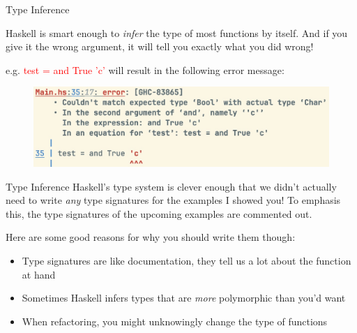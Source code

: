 \documentclass[pdf]{beamer}
\newcommand{\code}[1]{\textcolor{Red}{\textsf{#1}}}
\begin{document}
\begin{frame}[fragile]{Type Inference}
  \begin{figure}[H]
    \centering
    \hspace{0.1cm}
  \end{figure}
  Haskell is smart enough to \textit{infer} the type of most functions by itself. And if you give it the wrong argument, it will tell you exactly what you did wrong!

  e.g. \code{test = and True 'c'} will result in the following error message:
  \begin{figure}[H]
    \centering
    \includegraphics[width=\linewidth]{and-type-error}
  \end{figure}
\end{frame}

\begin{frame}{Type Inference}
  Haskell's type system is clever enough that we didn't actually need to write \emph{any} type signatures for the examples I showed you!
  To emphasis this, the type signatures of the upcoming examples are commented out.

  Here are some good reasons for why you should write them though:
  \begin{itemize}
  \item Type signatures are like documentation, they tell us a lot about the function at hand
  \item Sometimes Haskell infers types that are \emph{more} polymorphic than you'd want
  \item When refactoring, you might unknowingly change the type of functions
  \end{itemize}
\end{frame}
\end{document}
